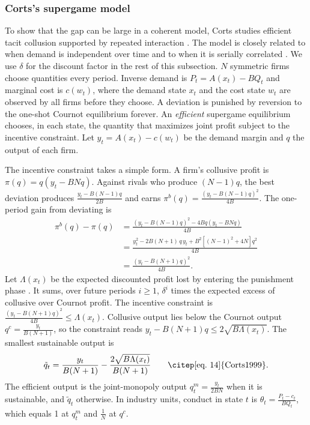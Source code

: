 \subsubsection{Corts's supergame model}

To show that the gap can be large in a coherent model, Corts studies efficient tacit collusion supported by repeated
interaction \citep[Section~3]{Corts1999}. The model is closely related to \citet{RotembergSaloner1986} when demand is
independent over time and to \citet{Kandori1991} when it is serially correlated \citep[fn.~2]{Corts1999}. We use
$\delta$ for the discount factor in the rest of this subsection. $N$
symmetric firms choose quantities every period. Inverse demand is $P_t = A(x_t) - BQ_t$ and marginal cost is $c(w_t)$,
where the demand state $x_t$ and the cost state $w_t$ are observed by all firms before they choose. A deviation is
punished by reversion to the one-shot Cournot equilibrium forever. An \emph{efficient} supergame equilibrium chooses, in
each state, the quantity that maximizes joint profit subject to the incentive constraint. Let $y_t = A(x_t) - c(w_t)$ be
the demand margin and $q$ the output of each firm.

The incentive constraint takes a simple form. A firm's collusive profit is $\pi(q) = q(y_t - BNq)$. Against rivals who
produce $(N - 1)q$, the best deviation produces $\frac{y_t - B(N - 1)q}{2B}$ and earns $\pi^b(q) = \frac{(y_t - B(N -
1)q)^2}{4B}$. The one-period gain from deviating is
\begin{align*}
\pi^b(q) - \pi(q) &= \frac{(y_t - B(N - 1)q)^2 - 4Bq(y_t - BNq)}{4B}\\
&= \frac{y_t^2 - 2B(N + 1)\, q\, y_t + B^2\left[(N - 1)^2 + 4N\right]q^2}{4B}\\
&= \frac{\left(y_t - B(N + 1)q\right)^2}{4B} .
\end{align*}
Let $\Lambda(x_t)$ be the expected discounted profit lost by entering the punishment phase \citep[eq.~15]{Corts1999}. It sums,
over future periods $i \ge 1$, $\delta^i$ times the expected excess of collusive over Cournot profit. The incentive
constraint is $\frac{(y_t - B(N + 1)q)^2}{4B} \le \Lambda(x_t)$. Collusive output lies below the Cournot output $q^c =
\frac{y_t}{B(N + 1)}$, so the constraint reads $y_t - B(N + 1)q \le 2\sqrt{B \Lambda(x_t)}$. The smallest sustainable output is
\begin{equation}\label{eq:03-corts-qtilde}
\tilde q_t = \frac{y_t}{B(N + 1)} - \frac{2\sqrt{B \Lambda(x_t)}}{B(N + 1)} \qquad \text{\citep[eq.~14]{Corts1999}}.
\end{equation}
The efficient output is the joint-monopoly output $q^m_t = \frac{y_t}{2BN}$ when it is sustainable, and $\tilde q_t$
otherwise. In industry units, conduct in state $t$ is $\theta_t = \frac{P_t - c_t}{BQ_t}$, which equals 1 at $q^m_t$ and
$\frac{1}{N}$ at $q^c$.

